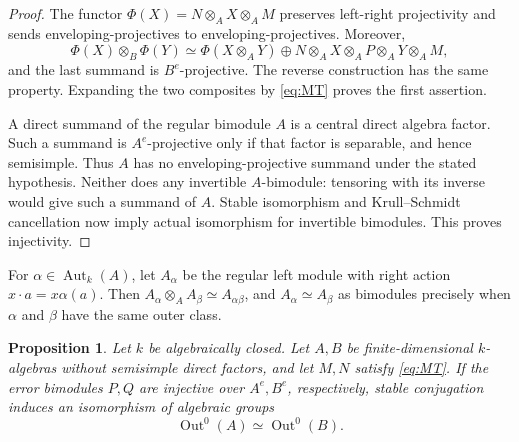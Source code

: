 \documentclass[12pt,a4paper,english,reqno]{amsart}
\numberwithin{equation}{section}
\theoremstyle{plain}
\newtheorem{proposition}[theorem]{Proposition}
\theoremstyle{definition}
\begin{document}
\begin{proof}
The functor $\Phi(X)=N\otimes_AX\otimes_AM$ preserves
left-right projectivity and sends enveloping-projectives to
enveloping-projectives. Moreover,
\[
 \Phi(X)\otimes_B\Phi(Y)
 \simeq\Phi(X\otimes_AY)
 \oplus N\otimes_AX\otimes_AP\otimes_AY\otimes_AM,
\]
and the last summand is $B^e$-projective. The reverse construction
has the same property. Expanding the two composites by
\eqref{eq:MT} proves the first assertion.

A direct summand of the regular bimodule $A$ is a central direct
algebra factor. Such a summand is $A^e$-projective only if that
factor is separable, and hence semisimple. Thus $A$ has no
enveloping-projective summand under the stated hypothesis. Neither
does any invertible $A$-bimodule: tensoring with its inverse would
give such a summand of $A$. Stable isomorphism and Krull--Schmidt
cancellation now imply actual isomorphism for invertible
bimodules. This proves injectivity.
\end{proof}

For $\alpha\in\operatorname{Aut}_k(A)$, let $A_\alpha$ be the
regular left module with right action $x\cdot a=x\alpha(a)$.
Then $A_\alpha\otimes_AA_\beta\simeq A_{\alpha\beta}$, and
$A_\alpha\simeq A_\beta$ as bimodules precisely when $\alpha$ and
$\beta$ have the same outer class.

\begin{proposition}\label{out:pi-errors}
Let $k$ be algebraically closed. Let $A,B$ be finite-dimensional
$k$-algebras without semisimple direct factors, and let $M,N$
satisfy \eqref{eq:MT}. If the error bimodules $P,Q$ are injective
over $A^e,B^e$, respectively, stable conjugation induces an
isomorphism of algebraic groups
\[
 \operatorname{Out}^0(A)\simeq\operatorname{Out}^0(B).
\]
\end{proposition}
\end{document}
